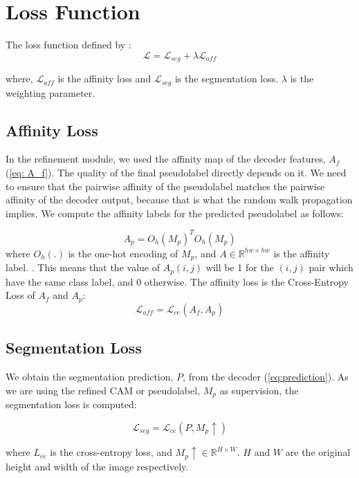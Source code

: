\section{Loss Function}
\label{subsec:loss_func}

The loss function defined by \cite{wsss_frozen_clip}:
\begin{equation}
    \mathcal{L} = \mathcal{L}_{seg} + \lambda \mathcal{L}_{aff}
\end{equation}

where, $\mathcal{L}_{aff}$ is the affinity loss and $\mathcal{L}_{seg}$ is the segmentation loss. $\lambda$ is the weighting parameter.
\subsection{Affinity Loss}
\label{aff_loss}

In the refinement module, we used the affinity map of the decoder features, $A_f$ (\autoref{eq: A_f}). The quality of the final pseudolabel directly depends on it. We need to ensure that the pairwise affinity of the pseudolabel matches the pairwise affinity of the decoder output, because that is what the random walk propagation implies.
We compute the affinity labels for the predicted pseudolabel as follows:

\begin{equation}
    A_p = O_h(M_p)^TO_h(M_p)
\end{equation}
where $O_h(.)$ is the one-hot encoding of $M_p$, and $A \in \mathbb{R}^{hw \times hw}$  is the affinity label.
. This means that the value of $A_p(i,j)$ will be 1 for the $(i,j)$ pair which have the same class label, and 0 otherwise. The affinity loss is the Cross-Entropy Loss of $A_f$ and $A_p$:
\begin{equation}
    \mathcal{L}_{aff} = \mathcal{L}_{ce}(A_f, A_p)
\end{equation}

\subsection{Segmentation Loss}
\label{seg_loss}
We obtain the segmentation prediction, $P$, from the decoder (\autoref{eq:prediction}). As we are using the refined CAM or pseudolabel, $M_p$ as supervision, the segmentation loss is computed:

\begin{equation}
    \mathcal{L}_{seg} = \mathcal{L}_{ce}(P, M_p \uparrow)
\end{equation}

where \( L_{ce} \) is the cross-entropy loss, and \( M_p{\uparrow} \in \mathbb{R}^{H \times W} \). $H$ and $W$ are the original height and width of the image respectively.


